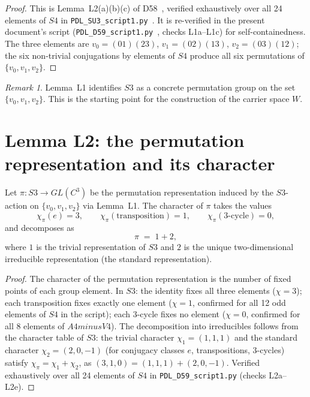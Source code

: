 \documentclass[11pt,a4paper]{article}
\def\Sfour{S4}%
\def\Vfour{V4}%
\def\Afour{A4}%
\def\Sthree{S3}%
\def\cong{=}%
\def\setminus{ minus }%
\def\oplus{+}%
\def\mathbb#1{#1}%
\def\mathrm#1{#1}%
\def\mathbf#1{#1}%
\newenvironment{lemmabox}[1][]{%
  \begin{tcolorbox}[lemmastyle,title={Lemma\ifx\relax#1\relax\else: #1\fi}]}{\end{tcolorbox}}
\theoremstyle{plain}
\theoremstyle{definition}
\theoremstyle{remark}
\newtheorem{remark}[theorem]{Remark}
\newcommand{\Sfour}{S_4}
\newcommand{\Afour}{A_4}
\newcommand{\Vfour}{V_4}
\newcommand{\Sthree}{S_3}
\begin{document}
\begin{proof}
This is Lemma~L2(a)(b)(c) of D58~\cite{PDL_D58}, verified exhaustively over all 24 elements of $\Sfour$ in \texttt{PDL\_SU3\_script1.py}~\cite{PDL_SU3_script1}. It is re-verified in the present document's script (\texttt{PDL\_D59\_script1.py}~\cite{PDL_D59_script1}, checks L1a--L1c) for self-containedness. The three elements are $v_0 = (01)(23)$, $v_1 = (02)(13)$, $v_2 = (03)(12)$; the six non-trivial conjugations by elements of $\Sfour$ produce all six permutations of $\{v_0, v_1, v_2\}$.
\end{proof}

\begin{remark}
Lemma~L1 identifies $\Sthree$ as a concrete permutation group on the set $\{v_0, v_1, v_2\}$. This is the starting point for the construction of the carrier space $W$.
\end{remark}

\section{Lemma L2: the permutation representation and its character}
\label{sec:L2}

\begin{lemmabox}[L2 --- Character decomposition of the permutation representation]
\label{lem:L2}
Let $\pi\colon \Sthree \to \mathrm{GL}(\mathbb{C}^3)$ be the permutation representation induced by the $\Sthree$-action on $\{v_0, v_1, v_2\}$ via Lemma~L1. The character of $\pi$ takes the values
\[
\chi_\pi(e) = 3, \qquad \chi_\pi(\text{transposition}) = 1, \qquad \chi_\pi(\text{3-cycle}) = 0,
\]
and decomposes as
\[
\pi \;\cong\; \mathbf{1} \oplus \mathbf{2},
\]
where $\mathbf{1}$ is the trivial representation of $\Sthree$ and $\mathbf{2}$ is the unique two-dimensional irreducible representation (the standard representation).
\end{lemmabox}

\begin{proof}
The character of the permutation representation is the number of fixed points of each group element. In $\Sthree$: the identity fixes all three elements ($\chi = 3$); each transposition fixes exactly one element ($\chi = 1$, confirmed for all 12 odd elements of $\Sfour$ in the script); each 3-cycle fixes no element ($\chi = 0$, confirmed for all 8 elements of $\Afour \setminus \Vfour$). The decomposition into irreducibles follows from the character table of $\Sthree$: the trivial character $\chi_{\mathbf{1}} = (1,1,1)$ and the standard character $\chi_{\mathbf{2}} = (2,0,-1)$ (for conjugacy classes $e$, transpositions, 3-cycles) satisfy $\chi_\pi = \chi_{\mathbf{1}} + \chi_{\mathbf{2}}$, as $(3,1,0) = (1,1,1) + (2,0,-1)$. Verified exhaustively over all 24 elements of $\Sfour$ in \texttt{PDL\_D59\_script1.py} (checks L2a--L2e).
\end{proof}
\end{document}
